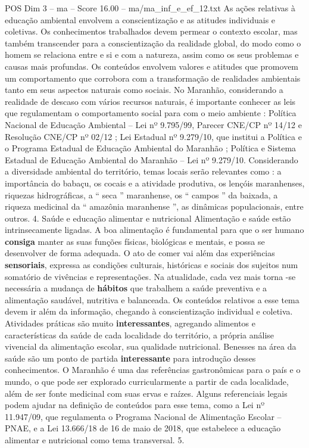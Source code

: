 \begin{textsample}{POS Dim 3 – ma – Score 16.00 – ma/ma\_inf\_e\_ef\_12.txt}
As ações relativas à educação ambiental envolvem a conscientização e as atitudes individuais e coletivas.
Os conhecimentos trabalhados devem permear o contexto escolar, mas também transcender para a conscientização da realidade global, do modo como o homem se relaciona entre e si e com a natureza, assim como os seus problemas e causas mais profundas.
Os conteúdos envolvem valores e atitudes que promovem um comportamento que corrobora com a transformação de realidades ambientais tanto em seus aspectos naturais como sociais.
No Maranhão, considerando a realidade de descaso com vários recursos naturais, é importante conhecer as leis que regulamentam o comportamento social para com o meio ambiente : Política Nacional de Educação Ambiental – Lei nº 9.795/99, Parecer CNE/CP nº 14/12 e Resolução CNE/CP nº 02/12 ; Lei Estadual nº 9.279/10, que institui a Política e o Programa Estadual de Educação Ambiental do Maranhão ; Política e Sistema Estadual de Educação Ambiental do Maranhão – Lei nº 9.279/10.
Considerando a diversidade ambiental do território, temas locais serão relevantes como : a importância do babaçu, os cocais e a atividade produtiva, os lençóis maranhenses, riquezas hidrográficas, a “ seca ” maranhense, os “ campos ” da baixada, a riqueza medicinal da “ amazônia maranhense ”, as dinâmicas populacionais, entre outros. 4.
Saúde e educação alimentar e nutricional Alimentação e saúde estão intrinsecamente ligadas.
A boa alimentação é fundamental para que o ser humano \textbf{consiga} manter as suas funções físicas, biológicas e mentais, e possa se desenvolver de forma adequada.
O ato de comer vai além das experiências \textbf{sensoriais}, expressa as condições culturais, históricas e sociais dos sujeitos num somatório de vivências e representações.
Na atualidade, cada vez mais torna -se necessária a mudança de \textbf{hábitos} que trabalhem a saúde preventiva e a alimentação saudável, nutritiva e balanceada.
Os conteúdos relativos a esse tema devem ir além da informação, chegando à conscientização individual e coletiva.
Atividades práticas são muito \textbf{interessantes}, agregando alimentos e características da saúde de cada localidade do território, a própria análise vivencial da alimentação escolar, sua qualidade nutricional.
Benesses na área da saúde são um ponto de partida \textbf{interessante} para introdução desses conhecimentos.
O Maranhão é uma das referências gastronômicas para o país e o mundo, o que pode ser explorado curricularmente a partir de cada localidade, além de ser fonte medicinal com suas ervas e raízes.
Alguns referenciais legais podem ajudar na definição de conteúdos para esse tema, como a Lei nº 11.947/09, que regulamenta o Programa Nacional de Alimentação Escolar – PNAE, e a Lei 13.666/18 de 16 de maio de 2018, que estabelece a educação alimentar e nutricional como tema transversal. 5.

\end{textsample}
